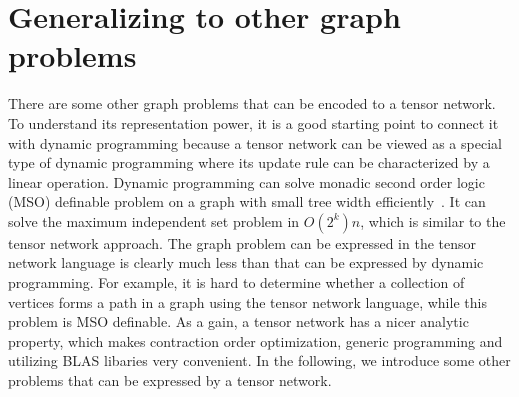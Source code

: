 \documentclass[onefignum, onetabnum]{siamart190516}
\newcommand{\<}{\langle}
\renewcommand{\>}{\rangle}
\newcommand{\Eq}[1]{Eq.~(\ref{#1})}
\newcounter{example}
\begin{document}
\section{Generalizing to other graph problems}\label{app:otherproblems}
There are some other graph problems that can be encoded to a tensor network.
To understand its representation power, it is a good starting point to connect it with dynamic programming because
a tensor network can be viewed as a special type of dynamic programming where its update rule can be characterized by a linear operation.
Dynamic programming can solve monadic second order logic (MSO) definable problem on a graph with small tree width efficiently~\cite{Courcelle1990,Barr2020}.
It can solve the maximum independent set problem in $O(2^k)n$, which is similar to the tensor network approach.
The graph problem can be expressed in the tensor network language is clearly much less than that can be expressed by dynamic programming.
For example, it is hard to determine whether a collection of vertices forms a path in a graph using the tensor network language, while this problem is MSO definable.
As a gain, a tensor network has a nicer analytic property, which makes contraction order optimization, generic programming and utilizing BLAS libaries very convenient.
In the following, we introduce some other problems that can be expressed by a tensor network.
\end{document}
